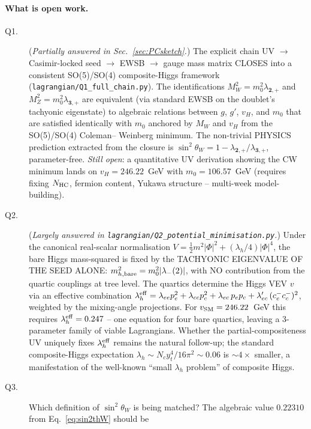 \documentclass[11pt,a4paper]{article}
\newcommand{\md}{\mathbf{2}}
\newcommand{\mt}{\mathbf{3}}
\begin{document}
\paragraph{What is open work.}
\begin{description}
\item[Q1.] (\emph{Partially answered in Sec.~\ref{sec:PCsketch}.}) The
  explicit chain UV $\to$ Casimir-locked seed $\to$ EWSB $\to$ gauge
  mass matrix CLOSES into a consistent SO(5)/SO(4) composite-Higgs
  framework (\texttt{lagrangian/Q1\_full\_chain.py}). The
  identifications $M_W^2 = m_0^2 \lambda_{\md,+}$ and
  $M_Z^2 = m_0^2 \lambda_{\mt,+}$ are equivalent (via standard EWSB on
  the doublet's tachyonic eigenstate) to algebraic relations between
  $g$, $g'$, $v_H$, and $m_0$ that are satisfied identically with
  $m_0$ anchored by $M_W$ and $v_H$ from the SO(5)/SO(4) Coleman--
  Weinberg minimum. The non-trivial PHYSICS prediction extracted from
  the closure is $\sin^2\theta_W = 1 - \lambda_{\md,+}/\lambda_{\mt,+}$,
  parameter-free. \emph{Still open}: a quantitative UV derivation
  showing the CW minimum lands on $v_H = 246.22$~GeV with $m_0 =
  106.57$~GeV (requires fixing $N_{\rm HC}$, fermion content, Yukawa
  structure -- multi-week model-building).
\item[Q2.] (\emph{Largely answered in
  \texttt{lagrangian/Q2\_potential\_minimisation.py}.}) Under the
  canonical real-scalar normalisation $V = \tfrac{1}{2} m^2 |\Phi|^2 +
  (\lambda_h/4) |\Phi|^4$, the bare Higgs mass-squared is fixed by the
  TACHYONIC EIGENVALUE OF THE SEED ALONE: $m_{h,\rm bare}^2 = m_0^2
  |\lambda_-(2)|$, with NO contribution from the quartic couplings at
  tree level. The quartics determine the Higgs VEV $v$ via an effective
  combination $\lambda_h^{\rm eff} = \lambda_{ee} p_e^2 + \lambda_{cc}
  p_c^2 + \lambda_{ec}\, p_e p_c + \lambda_{ec}'\, (c_e^- c_c^-)^2$,
  weighted by the mixing-angle projections. For $v_{\rm SM}=246.22$~GeV
  this requires $\lambda_h^{\rm eff} = 0.247$ -- one equation for four
  bare quartics, leaving a 3-parameter family of viable Lagrangians.
  Whether the partial-compositeness UV uniquely fixes $\lambda_h^{\rm
  eff}$ remains the natural follow-up; the standard composite-Higgs
  expectation $\lambda_h \sim N_c y_t^4 / 16\pi^2 \sim 0.06$ is $\sim
  4\times$ smaller, a manifestation of the well-known ``small
  $\lambda_h$ problem'' of composite Higgs.
\item[Q3.] Which definition of $\sin^2\theta_W$ is being matched? The
  algebraic value $0.22310$ from Eq.~\eqref{eq:sin2thW} should be

\end{description}
\end{document}
